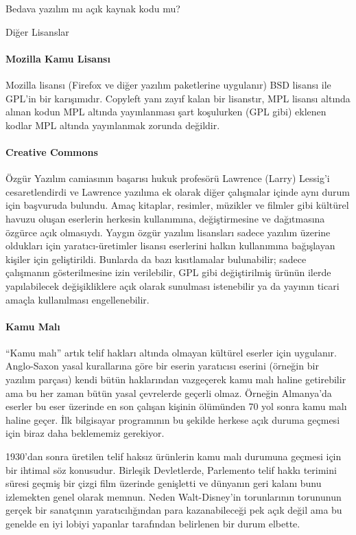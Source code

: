 \begin{section}{Bedava yazılım mı açık kaynak kodu mu?}
\begin{subsection}{Diğer Lisanslar}
\paragraph{Mozilla Kamu Lisansı}{Mozilla lisansı (Firefox ve diğer yazılım paketlerine uygulanır) BSD lisansı ile GPL'in bir karışımıdır. Copyleft yanı zayıf kalan bir lisanstır, MPL lisansı altında alınan kodun MPL altında yayınlanması şart koşulurken (GPL gibi) eklenen kodlar MPL altında yayınlanmak zorunda değildir.}
\paragraph{Creative Commons}{Özgür Yazılım camiasının başarısı hukuk profesörü Lawrence (Larry) Lessig'i cesaretlendirdi ve Lawrence yazılıma ek olarak diğer çalışmalar içinde aynı durum için başvuruda bulundu. Amaç kitaplar, resimler, müzikler ve filmler gibi kültürel havuzu oluşan eserlerin herkesin kullanımına, değiştirmesine ve dağıtmasına özgürce açık olmasıydı. Yaygın özgür yazılım lisansları sadece yazılım üzerine oldukları için yaratıcı-üretimler lisansı eserlerini halkın kullanımına bağışlayan kişiler için geliştirildi. Bunlarda da bazı kısıtlamalar bulunabilir; sadece çalışmanın gösterilmesine izin verilebilir, GPL gibi değiştirilmiş ürünün ilerde yapılabilecek değişikliklere açık olarak sunulması istenebilir ya da yayının ticari amaçla kullanılması engellenebilir.}
\paragraph{Kamu Malı}{“Kamu malı” artık telif hakları altında olmayan kültürel eserler için uygulanır. Anglo-Saxon yasal kurallarına göre bir eserin yaratıcısı eserini (örneğin bir yazılım parçası) kendi bütün haklarından vazgeçerek kamu malı haline getirebilir ama bu her zaman bütün yasal çevrelerde geçerli olmaz. Örneğin Almanya'da eserler bu eser üzerinde en son çalışan kişinin ölümünden 70 yol sonra kamu malı haline geçer. İlk bilgisayar programının bu şekilde herkese açık duruma geçmesi için biraz daha beklememiz gerekiyor.}

1930'dan sonra üretilen telif haksız ürünlerin kamu malı durumuna geçmesi için bir ihtimal söz konusudur. Birleşik Devletlerde, Parlemento telif hakkı terimini süresi geçmiş bir çizgi film üzerinde genişletti ve dünyanın geri kalanı bunu izlemekten genel olarak memnun. Neden Walt-Disney'in torunlarının torununun gerçek bir sanatçının yaratıcılığından para kazanabileceği pek açık değil ama bu genelde en iyi lobiyi yapanlar tarafından belirlenen bir durum elbette.


\end{subsection}
\end{section}
